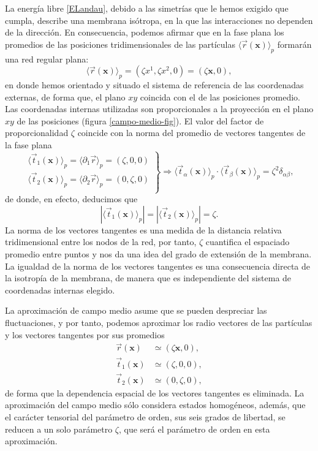 La energía libre \eqref{ELandau}, debido a las simetrías que le hemos exigido
que cumpla, describe una membrana isótropa, en la que las interacciones no
dependen de la dirección. En consecuencia, podemos afirmar que en la fase
plana los promedios de las posiciones tridimensionales de las partículas
$\langle\vec{r}(\mathbf{x})\rangle_{p}$ formarán una red regular plana:  
\begin{equation*}
 \langle\vec{r}(\mathbf{x})\rangle_{p}=(\zeta x^1,\zeta x^2,0)=(\zeta \mathbf{x},0), 
\end{equation*}
en donde hemos orientado y situado el sistema de referencia de las coordenadas
externas, de forma que, el plano $xy$ coincida con el de las
posiciones promedio. Las coordenadas internas utilizadas son 
proporcionales a la proyección en el plano $xy$ de las posiciones (figura
\ref{campo-medio-fig}). El valor del factor de proporcionalidad $\zeta$
coincide con la norma del promedio de vectores tangentes de la fase plana
\begin{equation}
 \left.\begin{array}{c}
\langle\vec{t}_{1}(\mathbf{x})\rangle_{p}=\langle\partial_1\vec{r}\rangle_{p}=(\zeta ,0,0)\\
\langle\vec{t}_{2}(\mathbf{x})\rangle_{p}=\langle\partial_2\vec{r}\rangle_{p}=(0,\zeta ,0)\\
 \end{array}\right\}\Rightarrow
\langle\vec{t}_{\alpha}(\mathbf{x})\rangle_{p}\cdot\langle\vec{t}_{\beta}(\mathbf{x})\rangle_{p}=\zeta^2 \delta_{\alpha\beta},
\end{equation}
de donde, en efecto, deducimos que
\begin{equation*}
|\langle\vec{t}_1(\mathbf{x})\rangle_{p}|=|\langle\vec{t}_2(\mathbf{x})\rangle_{p}|=\zeta.
\end{equation*}
La norma de los vectores tangentes es una medida de la distancia relativa
tridimensional entre los nodos de la red, por tanto, $\zeta$ cuantifica el
espaciado promedio entre puntos y nos da una idea del grado de extensión de la
membrana. La igualdad de la norma de los vectores tangentes es una consecuencia
directa de la isotropía de la membrana, de manera que es independiente del
sistema de coordenadas internas elegido.

La aproximación de campo medio asume que se pueden despreciar las
fluctuaciones, y por tanto, podemos aproximar los radio vectores de las
partículas y los vectores tangentes por sus promedios
\begin{align*}
 \vec{r}(\mathbf{x})&\simeq(\zeta \mathbf{x},0),\\
 \vec{t}_1(\mathbf{x})&\simeq(\zeta ,0,0),\\
 \vec{t}_2(\mathbf{x})&\simeq(0,\zeta,0),
\end{align*}
de forma que la dependencia espacial de los vectores tangentes es eliminada. La
aproximación del campo medio sólo considera estados homogéneos, además, que
el carácter tensorial del parámetro de orden, sus seis grados de libertad, se
reducen a un solo parámetro $\zeta$, que será el parámetro de orden en esta
aproximación.

